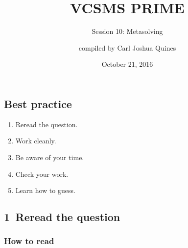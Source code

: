\documentclass[10pt,paper=letter]{scrartcl}
\begin{document}
\title{VCSMS PRIME}
\subtitle{Session 10: Metasolving}
\author{compiled by Carl Joshua Quines}
\date{October 21, 2016}

\maketitle

\subsection*{Best practice}

\begin{enumerate}

\item Reread the question.

\item Work cleanly.

\item Be aware of your time.

\item Check your work.

\item Learn how to guess.

\end{enumerate}

\subsection*{1 \,Reread the question}

\subsubsection*{How to read}
\end{document}
